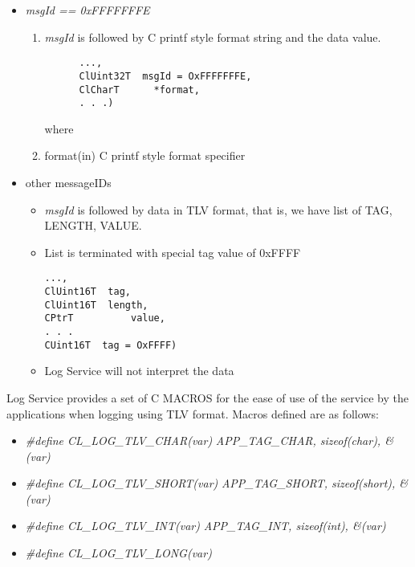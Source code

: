 \begin{flushleft}
\begin{itemize}
\begin{Desc}
\begin{itemize}
\item
\textit{msgId == 0xFFFFFFFE}
\begin{enumerate}
\item
\textit{msgId} is followed by C printf style format string and the data value.
       \footnotesize\begin{verbatim}
      ...,
      ClUint32T  msgId = OxFFFFFFFE, 
      ClCharT      *format, 
      . . .)
      \end{verbatim}
            \normalsize
where
\item
format(in) C printf style format specifier
\end{enumerate}

\item other messageIDs
\begin{itemize}
\item
\textit{msgId} is followed by data in TLV format, that is, we have list of TAG, LENGTH, VALUE.
\item List is terminated with special tag value of 0xFFFF
\footnotesize\begin{verbatim}
..., 
ClUint16T  tag,
ClUint16T  length,
CPtrT          value,
. . .
CUint16T  tag = OxFFFF)
      \end{verbatim}
            \normalsize
\item
Log Service will not interpret the data
\end{itemize}
\end{itemize}
\par
Log Service provides a set of C MACROS for the ease of use of the service by the applications when logging using TLV format. 
Macros defined are as follows:
\begin{itemize}
\item
\textit{\#define CL\_\-LOG\_\-TLV\_\-CHAR(var)                          }
             \newline \textit{     APP\_\-TAG\_\-CHAR, sizeof(char), \&(var)}
\item	\textit{\#define CL\_\-LOG\_\-TLV\_\-SHORT(var)}                       
                  \newline \textit{APP\_\-TAG\_\-SHORT, sizeof(short), \&(var)}
\item	\textit{\#define CL\_\-LOG\_\-TLV\_\-INT(var)                               }
                  \newline \textit{APP\_\-TAG\_\-INT, sizeof(int), \&(var)}
\item	\textit{\#define CL\_\-LOG\_\-TLV\_\-LONG(var)                                     }

\end{itemize}
\end{Desc}
\end{itemize}
\end{flushleft}
